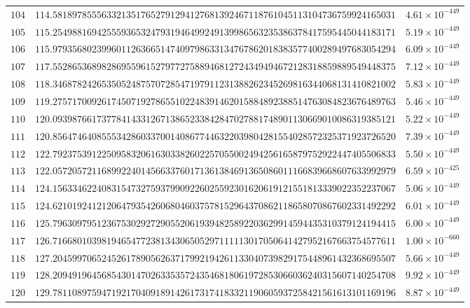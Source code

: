\documentclass[12pt,reqno]{amsart}
\theoremstyle{remark}
\begin{document}
\begin{longtable}{clc}
$104$ & $114.5818978555633213517652791294127681392467118761045113104736759924165031$ & $4.61\times 10^{-449}$ \\
$105$ & $115.2549881694255593653247931946499249139986563235386378417595445044183171$ & $5.19\times 10^{-449}$ \\
$106$ & $115.9793568023996011263665147409798633134767862018383577400289497683054294$ & $6.09\times 10^{-449}$ \\
$107$ & $117.5528653689828695596152797727588946812724349494672128318859889549448375$ & $7.12\times 10^{-449}$ \\
$108$ & $118.3468782426535052487570728547197911231388262345269816344068131410821002$ & $5.83\times 10^{-449}$ \\
$109$ & $119.2757170092617450719278655102248391462015884892388514763084823676489763$ & $5.46\times 10^{-449}$ \\
$110$ & $120.0939876617377841433126713865233842847027881748901130669010086319385121$ & $5.22\times 10^{-449}$ \\
$111$ & $120.8564746408555342860337001408677446322039804281554028572325371923726520$ & $7.39\times 10^{-449}$ \\
$112$ & $122.7923753912250958320616303382602257055002494256165879752922447405506833$ & $5.50\times 10^{-449}$ \\
$113$ & $122.0572057211689922401456633760171361384691365086011166839668607633992979$ & $6.59\times 10^{-425}$ \\
$114$ & $124.1563346224083154732759379909226025592301620619121551813339022352237067$ & $5.06\times 10^{-449}$ \\
$115$ & $124.6210192412120647935426068046037578152964370862118658070867602331492292$ & $6.01\times 10^{-449}$ \\
$116$ & $125.7963097951236753029272905520619394825892203629914594435310379124194415$ & $6.00\times 10^{-449}$ \\
$117$ & $126.7166801039819465477238134306505297111113017050641427952167663754577611$ & $1.00\times 10^{-660}$ \\
$118$ & $127.2045997065245261789056263717992194261133040739829175448961432368695507$ & $5.66\times 10^{-449}$ \\
$119$ & $128.2094919645685430147026335357243546818061972853066036240315607140254708$ & $9.92\times 10^{-449}$ \\
$120$ & $129.7811089759471921704091891426173174183321190605937258421561613101169196$ & $8.87\times 10^{-449}$ \\

\end{longtable}
\end{document}
